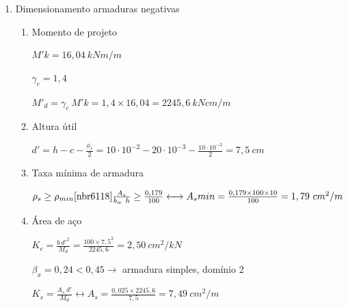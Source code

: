 
\begin{resposta}
    \begin{enumerate}[start=9]

        \item Dimensionamento armaduras negativas
        
        
        
         

        

        \begin{enumerate}
            \item Momento de projeto

            $M'k = 16,04 \ kN m/m$

            $\gamma_c = 1,4$ \cite[tabela 12.1]{nbr6118}

            $M'_d = \gamma_c \ M'k = 1,4 \times 16,04 = 2245,6 \ kN cm/m$ \newline

            \item Altura útil
            
            $d' = h - c - \frac{\phi_\ell}{2} = 10 \cdot 10^{-2} - 20 \cdot 10^{-3} - \frac{ 10\cdot 10^{-3}}{2} = 7,5 \ cm$ \newline
            
            \item Taxa mínima de armadura
            
            $\rho_s \geq \rho_{min} \text{\cite[tabela 17.3 e tabela 19.1]{nbr6118}} \newline \frac{A_s}{b_w\ h} \geq \frac{0,179}{100} \longleftrightarrow A_s{min} = \frac{0,179 \times 100 \times 10}{100} = 1,79 \ cm^2/m$ \newline
            
            \item Área de aço
            
            $K_c = \frac{b\ d'^2}{M_d} = \frac{100 \times 7,5^2}{2245,6} = 2,50 \ cm^2/kN$

            $\beta_x = 0,24 < 0,45 \to$ armadura simples, domínio 2 \cite[tabela 1.1a]{tabelaskcks}

            $K_s = \frac{A_s \ d'}{M_d} \longleftrightarrow A_s =\frac{0,025 \times 2245,6}{7,5} = 7,49\ cm^2/m$ \newline

            

\end{enumerate}
\end{enumerate}
\end{resposta}
